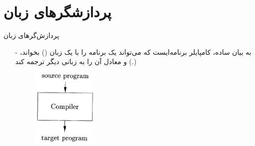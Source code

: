 \section{پردازشگر‌های زبان}
\begin{frame}[fragile]{پردازش‌گر‌های زبان}
\begin{itemize}\itemr
\item[-]
به بیان ساده، کامپایلر برنامه‌ایست که می‌تواند یک برنامه را با یک زبان () بخواند، و معادل آن را به زبانی دیگر ترجمه کند  (.)
\vspace{6mm}
\begin{figure}[H]
\begin{center}
\includegraphics[width=0.3\textwidth, height=0.6\textheight, angle=1]{docs/images/sct}
\end{center}
\end{figure}
\end{itemize}
\end{frame}